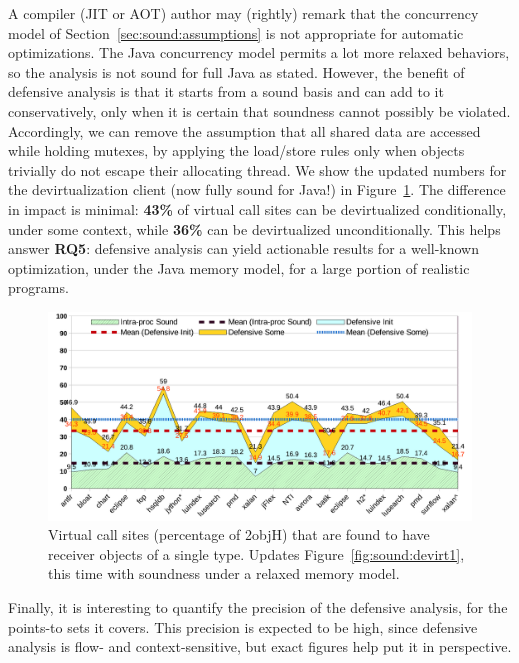 A compiler (JIT or AOT) author may (rightly) remark that the concurrency model of Section~\ref{sec:sound:assumptions} is not appropriate for automatic optimizations. The Java concurrency model permits a lot more relaxed behaviors, so the analysis is not sound for full Java as stated. However, the benefit of defensive analysis is that it starts from a sound basis and can add to it conservatively, only when it is certain that soundness cannot possibly be violated. Accordingly, we can remove the assumption that all shared data are accessed while holding mutexes, by applying the load/store rules only when objects trivially do not escape their allocating thread. We show the updated numbers for the devirtualization client (now fully sound for Java!) in Figure~\ref{fig:sound:devirt2}. The difference in impact is minimal: \textbf{43\%} of virtual call sites can be devirtualized conditionally, under some context, while \textbf{36\%} can be devirtualized unconditionally. This helps answer \textbf{RQ5}: defensive analysis can yield actionable results for a well-known optimization, under the Java memory model, for a large portion of realistic programs.

\begin{figure}[tbh]
\centering
\includegraphics[width=\linewidth]{assets/defensive/devirt2.pdf}
\caption{Virtual call sites (percentage of 2objH) that are found to have receiver objects of a single type. Updates Figure~\ref{fig:sound:devirt1}, this time with soundness under a relaxed memory model.}
\label{fig:sound:devirt2}
\end{figure}


Finally, it is interesting to quantify the precision of the defensive analysis, for the points-to sets it covers. This precision is expected to be high, since defensive analysis is flow- and context-sensitive, but exact figures help put it in perspective.

